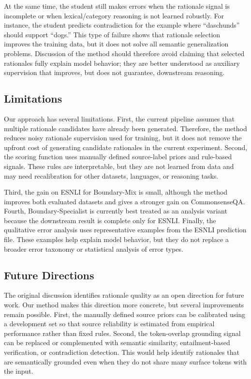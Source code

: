 At the same time, the student still makes errors when the rationale signal is incomplete or when lexical/category reasoning is not learned robustly. For instance, the student predicts contradiction for the example where ``daschunds'' should support ``dogs.'' This type of failure shows that rationale selection improves the training data, but it does not solve all semantic generalization problems. Discussion of the method should therefore avoid claiming that selected rationales fully explain model behavior; they are better understood as auxiliary supervision that improves, but does not guarantee, downstream reasoning.

\subsection{Limitations}
\label{sec:discussion-limitations}

Our approach has several limitations. First, the current pipeline assumes that multiple rationale candidates have already been generated. Therefore, the method reduces noisy rationale supervision used for training, but it does not remove the upfront cost of generating candidate rationales in the current experiment. Second, the scoring function uses manually defined source-label priors and rule-based signals. These rules are interpretable, but they are not learned from data and may need recalibration for other datasets, languages, or reasoning tasks.

Third, the gain on ESNLI for Boundary-Mix is small, although the method improves both evaluated datasets and gives a stronger gain on CommonsenseQA. Fourth, Boundary-Specialist is currently best treated as an analysis variant because the downstream result is complete only for ESNLI. Finally, the qualitative error analysis uses representative examples from the ESNLI prediction file. These examples help explain model behavior, but they do not replace a broader error taxonomy or statistical analysis of error types.

\subsection{Future Directions}
\label{sec:discussion-future}

The original discussion identifies rationale quality as an open direction for future work. Our method makes this direction more concrete, but several improvements remain possible. First, the manually defined source priors can be calibrated using a development set so that source reliability is estimated from empirical performance rather than fixed rules. Second, the token-overlap grounding signal can be replaced or complemented with semantic similarity, entailment-based verification, or contradiction detection. This would help identify rationales that are semantically grounded even when they do not share many surface tokens with the input.

